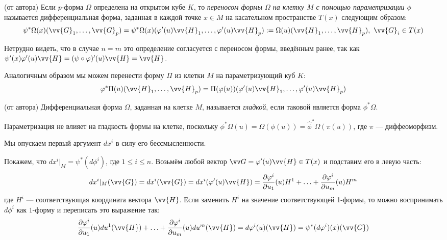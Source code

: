 \begin{definition} (от автора)
		Если $p$-форма $\Omega$ определена на открытом кубе $K$, то \textit{переносом формы $\Omega$ на клетку $M$ с помощью параметризации $\phi$} называется дифференциальная форма, заданная в каждой точке $x \in M$ на касательном пространстве $T(x)$ следующим образом:
		\[
			\psi^*\Omega(x)(\vv{G}_1, \ldots, \vv{G}_p) = \psi^*\Omega(x)(\phi'(u)\vv{H}_1, \ldots, \phi'(u)\vv{H}_p) := \Omega(u)(\vv{H}_1, \ldots, \vv{H}_p),\ \vv{G}_i \in T(x)
		\]
\end{definition}

\begin{note}
	Нетрудно видеть, что в случае $n = m$ это определение согласуется с переносом формы, введённым ранее, так как $\psi'(x)\phi'(u)\vv{H} = (\psi\circ\phi)'(u)\vv{H} = \vv{H}$.
\end{note}

\begin{note}
	Аналогичным образом мы можем перенести форму $\Pi$ из клетки $M$ на параметризующий куб $K$:
	\[
		\phi^*\Pi(u)(\vv{H}_1, \ldots, \vv{H}_p) = \Pi(\phi(u))(\phi'(u)\vv{H}_1, \ldots, \phi'(u)\vv{H}_p)
	\]
\end{note}

\begin{definition} (от автора)
	Дифференциальная форма $\Omega$, заданная на клетке $M$, называется \textit{гладкой}, если таковой является форма $\phi^* \Omega$.
\end{definition}

\begin{note}
	Параметризация не влияет на гладкость формы на клетке, поскольку $\phi^*\Omega(u) = \Omega(\phi(u)) = \hat\phi^*\Omega(\pi(u))$, где $\pi$ --- диффеоморфизм.
\end{note}

\begin{reminder}
	Мы опускаем первый аргумент $dx^i$ в силу его бессмысленности.
\end{reminder}

\begin{example}
	Покажем, что $dx^i|_M = \psi^*(d\phi^i)$, где $1 \le i \le n$. Возьмём любой вектор $\vv G = \phi'(u)\vv{H} \in T(x)$ и подставим его в левую часть:
	\[
		dx^i|_M(\vv{G}) = dx^i(\vv{G}) = dx^i(\phi'(u)\vv{H}) = \pd{\phi^i}{u_1}(u)H^1 + \ldots + \pd{\phi^i}{u_m}(u)H^m
	\]
	где $H^i$ --- соответствующая координата вектора $\vv{H}$. Если заменить $H^i$ на значение соответствующей 1-формы, то можно воспринимать $d\phi^i$ как $1$-форму и переписать это выражение так:
	\[
		\pd{\phi^i}{u_1}(u)du^1(\vv{H}) + \ldots + \pd{\phi^i}{u_m}(u)du^m(\vv{H}) = d\phi^i(u)(\vv{H}) = \psi^*(d\phi^i)(x)(\vv{G})
	\]
\end{example}


